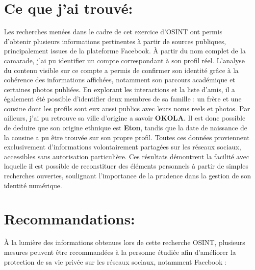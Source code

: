 \documentclass[14pt]{article}
\begin{document}
\section{Ce que j'ai trouvé:}

Les recherches menées dans le cadre de cet exercice d’OSINT ont permis d’obtenir plusieurs informations pertinentes à partir de sources publiques, principalement issues de la plateforme Facebook. À partir du nom complet de la camarade, j’ai pu identifier un compte correspondant à son profil réel. L’analyse du contenu visible sur ce compte a permis de confirmer son identité grâce à la cohérence des informations affichées, notamment son parcours académique et certaines photos publiées. En explorant les interactions et la liste d’amis, il a également été possible d’identifier deux membres de sa famille : un frère et une cousine dont les profils sont eux aussi publics avec leurs noms reels et photos. Par ailleurs, j'ai pu retrouve sa ville d'origine a savoir \textbf{OKOLA}. Il est donc possible de deduire que son origine ethnique est \textbf{Eton}, tandis que la date de naissance de la cousine a pu être trouvée sur son propre profil. Toutes ces données proviennent exclusivement d’informations volontairement partagées sur les réseaux sociaux, accessibles sans autorisation particulière. Ces résultats démontrent la facilité avec laquelle il est possible de reconstituer des éléments personnels à partir de simples recherches ouvertes, soulignant l’importance de la prudence dans la gestion de son identité numérique.



\section{Recommandations:}

À la lumière des informations obtenues lors de cette recherche OSINT, plusieurs mesures peuvent être recommandées à la personne étudiée afin d’améliorer la protection de sa vie privée sur les réseaux sociaux, notamment Facebook :
\end{document}
